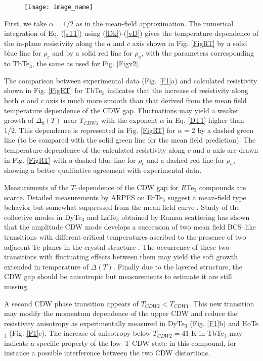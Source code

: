 \begin{figure}[h]
\texttt{[image: image\_name]}
\label{fig:label}
\end{figure}


First, we take $\alpha=1/2$ as in the mean-field approximation.
The numerical integration of Eq. (\ref{sT1}) using
(\ref{Dk})-(\ref{vD}) gives the temperature dependence of the
in-plane resistivity along the $a$ and $c$ axis shown in Fig.
\ref{FigRT} by a solid blue line for $\rho _{c}$ and by a solid
red line for $\rho _{a}$, with the parameters corresponding to
TbTe$_3$, the same as used for Fig. \ref{Figv2}.

The comparison between experimental data (Fig. \ref{F1}a) and
calculated resistivity shown in Fig. \ref{FigRT} for TbTe$_3$
indicates that the increase of resistivity along both $a$ and $c$
axis is much more smooth than that derived from the mean field
temperature dependence of the CDW gap. Fluctuations may yield a
weaker growth of $\Delta_0(T)$ near $T_{CDW1}$ with the exponent
$\alpha$ in Eq. \ref{DT1} higher than 1/2. This dependence is
represented in Fig. \ref{FigRT} for $\alpha=2$ by a dashed green
line (to be compared with the solid green line for the mean field
prediction). The temperature dependence of the calculated
resistivity along $c$ and $a$ axis are drawn in Fig. \ref{FigRT}
with a dashed blue line for $\rho_c$ and a dashed red line for
$\rho_a$, showing a better qualitative agreement with experimental
data.

Measurements of the $T$--dependence of the CDW gap for $R$Te$_3$
compounds are scarce. Detailed measurements by ARPES on ErTe$_3$
suggest a mean-field type behavior but somewhat suppressed from the
mean-field curve \cite{Moore10}. Study of the collective modes in
DyTe$_3$ and LaTe$_3$ obtained by Raman scattering has shown that
the amplitude CDW mode develops a succession of two mean field
BCS--like transitions with different critical temperatures ascribed
to the presence of two adjacent Te planes in the crystal structure
\cite{Lavagnini10R}. The occurrence of these two transitions with
fluctuating effects between them may yield the soft growth extended
in temperature of $\Delta(T)$. Finally due to the layered structure,
the CDW gap should be anisotropic but measurements to estimate it
are still missing.

A second CDW phase transition appears of $T_{CDW2}<T_{CDW1}$. This
new transition may modify the momentum dependence of the upper CDW
and reduce the resistivity anisotropy as experimentally measured in
DyTe$_3$ (Fig. \ref{F1}b) and HoTe$_3$ (Fig. \ref{F1}c). The
increase of anisotropy below $T_{CDW2}=41$ K in TbTe$_3$ may
indicate a specific property of the low--T CDW state in this
compound, for instance a possible interference between the two CDW
distortions.

